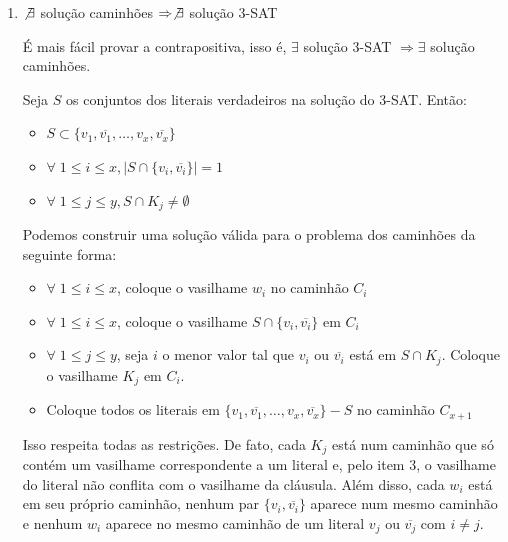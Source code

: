 \documentclass[11pt]{article}
\begin{document}
\begin{enumerate}
\begin{enumerate}
\item $\not \exists$ solução caminhões $\Rightarrow \not \exists$ solução 3-SAT
\label{sec-5-3-2-2-2}

É mais fácil provar a contrapositiva, isso é, $\exists$ solução 3-SAT
$\Rightarrow \exists$ solução caminhões.

Seja $S$ os conjuntos dos literais verdadeiros na solução do 3-SAT.
Então:
\begin{itemize}
\item $S \subset \{v_1,\overline{v_1}, \ldots, v_x, \overline{v_x}\}$
\item $\forall \; 1\leq i \leq x, |S\cap\{v_i, \overline{v_i}\}| = 1$
\item $\forall \; 1\leq j \leq y, S\cap K_j \neq \emptyset$
\end{itemize}

Podemos construir uma solução válida para o problema dos caminhões da
seguinte forma:
\begin{itemize}
\item $\forall \; 1\leq i \leq x$, coloque o vasilhame $w_i$ no caminhão $C_i$
\item $\forall \; 1\leq i \leq x$, coloque o vasilhame $S\cap\{v_i, \overline{v_i}\}$ em $C_i$
\item $\forall \; 1\leq j \leq y$, seja $i$ o menor valor tal que $v_i$ ou
$\overline{v_i}$ está em $S\cap K_j$. Coloque o vasilhame $K_j$ em $C_i$.
\item Coloque todos os literais em $\{v_1,\overline{v_1}, \ldots, v_x,
  \overline{v_x}\} - S$ no caminhão $C_{x+1}$
\end{itemize}


Isso respeita todas as restrições. De fato, cada $K_j$ está num
caminhão que só contém um vasilhame correspondente a um literal e,
pelo item 3, o vasilhame do literal não conflita com o vasilhame da
cláusula. Além disso, cada $w_i$ está em seu próprio caminhão, nenhum
par $\{v_i, \overline{v_i}\}$ aparece num mesmo caminhão e nenhum
$w_i$ aparece no mesmo caminhão de um literal $v_j$ ou
$\overline{v_j}$ com $i \neq j$.
\end{enumerate}
\end{enumerate}
\end{document}
